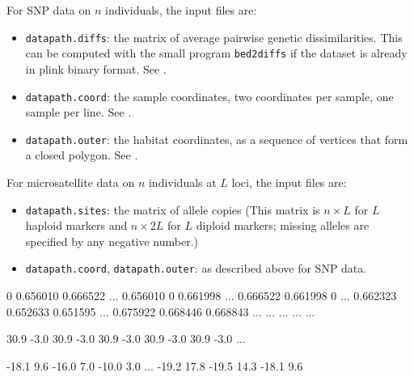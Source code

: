 \documentclass[a4paper,10pt,DIV=15,titlepage,mpinclude=true]{scrartcl}
\newcommand{\keystring}[1]{{\tt #1}}
\begin{document}
For SNP data on $n$ individuals, the input files are:
\begin{itemize}
  \item \keystring{datapath.diffs}: the matrix of average pairwise genetic dissimilarities. This can be computed with the small program \keystring{bed2diffs} if the dataset is already in plink binary format. See .
  \item \keystring{datapath.coord}: the sample coordinates, two coordinates per sample, one sample per line. See .
  \item \keystring{datapath.outer}: the habitat coordinates, as a sequence of vertices that form a closed polygon. See .
\end{itemize}

For microsatellite data on $n$ individuals at $L$ loci, the input files are:
\begin{itemize}
  \item \keystring{datapath.sites}: the matrix of allele copies (This matrix is $n\times L $ for $L$ haploid markers and $n\times2L$ for $L$ diploid markers; missing alleles are specified by any negative number.)
  \item \keystring{datapath.coord}, \keystring{datapath.outer}: as described above for SNP data.
\end{itemize}


\begin{myverbbox}{\WangetalIrregularHabitatDiffs}
       0  0.656010  0.666522   ...
0.656010         0  0.661998   ...
0.666522  0.661998         0   ...
0.662323  0.652633  0.651595   ...
0.675922  0.668446  0.668843   ...
     ...       ...       ...   ...
     
     
\end{myverbbox}

\begin{myverbbox}{\WangetalIrregularHabitatCoord}
30.9  -3.0
30.9  -3.0
30.9  -3.0
30.9  -3.0
30.9  -3.0
...


\end{myverbbox}

\begin{myverbbox}{\WangetalIrregularHabitatOuter}
-18.1  9.6
-16.0  7.0
-10.0  3.0
...
-19.2  17.8
-19.5  14.3
-18.1  9.6


\end{myverbbox}
\end{document}
